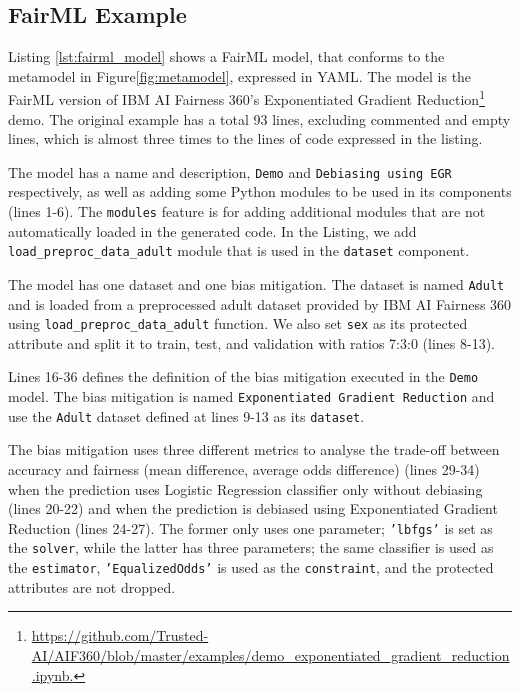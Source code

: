 \documentclass[sigconf,review]{acmart}
\begin{document}
\subsection{FairML Example}
\label{sec:fairml_example}
Listing \ref{lst:fairml_model} shows a FairML model, that conforms to the metamodel in Figure\ref{fig:metamodel}, expressed in YAML. The model is the FairML version of 
IBM AI Fairness 360's Exponentiated Gradient Reduction\footnote{\url{https://github.com/Trusted-AI/AIF360/blob/master/examples/demo_exponentiated_gradient_reduction.ipynb.}} demo. The original example has a total 93 lines, excluding commented and empty lines, which is almost three times to the lines of code expressed in the listing.

The model has a name and description, \texttt{Demo} and \texttt{Debiasing using EGR} respectively, as well as adding some Python modules to be used in its components (lines 1-6). The \texttt{modules} feature is for adding additional modules that are not automatically loaded in the generated code. In the Listing, we add \texttt{load\_preproc\_data\_adult} module that is used in the \texttt{dataset} component.

The model has one dataset and one bias mitigation. The dataset is named \texttt{Adult} and is loaded from a preprocessed adult dataset provided by IBM AI Fairness 360 using \texttt{load\_preproc\_data\_adult} function. We also set \texttt{sex} as its protected attribute and split it to train, test, and validation with ratios 7:3:0 (lines 8-13). 

Lines 16-36 defines the definition of the bias mitigation executed in the \texttt{Demo} model. The bias mitigation is named \texttt{Exponentiated Gradient Reduction} and use the \texttt{Adult} dataset defined at lines 9-13 as its \texttt{dataset}. 

The bias mitigation uses three different metrics to analyse the trade-off between accuracy and fairness (mean difference, average odds difference) (lines 29-34) when the prediction uses Logistic Regression classifier only without debiasing (lines 20-22) and when the prediction is debiased using Exponentiated Gradient Reduction (lines 24-27). The former only uses one parameter; \texttt{'lbfgs'} is set as the \texttt{solver}, while the latter has three parameters; the same classifier is used as the \texttt{estimator}, \texttt{'EqualizedOdds'} is used as the \texttt{constraint}, and the protected attributes are not dropped.
\end{document}
